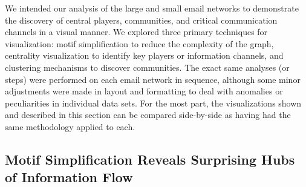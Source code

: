 \documentclass[11pt,letterpaper]{article}
\begin{document}


We intended our analysis of the large and small email networks to demonstrate the discovery of central players, communities, and critical communication channels in a visual manner. We explored three primary techniques for visualization: motif simplification to reduce the complexity of the graph, centrality visualization to identify key players or information channels, and clustering mechanisms to discover communities. The exact same analyses (or steps) were performed on each email network in sequence, although some minor adjustments were made in layout and formatting to deal with anomalies or peculiarities in individual data sets. For the most part, the visualizations shown and described in this section can be compared side-by-side as having had the same methodology applied to each.

\subsection*{Motif Simplification Reveals Surprising Hubs of Information Flow}
\end{document}
